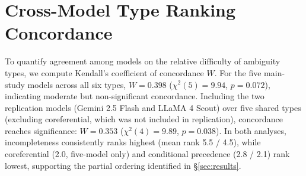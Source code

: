 \begin{table}[!ht]
\centering
\small
\caption{Mapping from Li et al.'s 11-type NLP taxonomy to our 6-type policy ambiguity taxonomy. Criteria: (1) RE attestation, (2) minimal-pair constructibility, (3) mutual exclusivity.}
\label{tab:li_mapping}
\setlength{\tabcolsep}{3pt}
\end{table}

\section{Cross-Model Type Ranking Concordance}
\label{app:kendall_w}

To quantify agreement among models on the relative difficulty of ambiguity types, we compute Kendall's coefficient of concordance $W$. For the five main-study models across all six types, $W = 0.398$ ($\chi^2(5) = 9.94$, $p = 0.072$), indicating moderate but non-significant concordance. Including the two replication models (Gemini 2.5 Flash and LLaMA 4 Scout) over five shared types (excluding coreferential, which was not included in replication), concordance reaches significance: $W = 0.353$ ($\chi^2(4) = 9.89$, $p = 0.038$). In both analyses, incompleteness consistently ranks highest (mean rank 5.5 / 4.5), while coreferential (2.0, five-model only) and conditional precedence (2.8 / 2.1) rank lowest, supporting the partial ordering identified in \S\ref{sec:results}.


